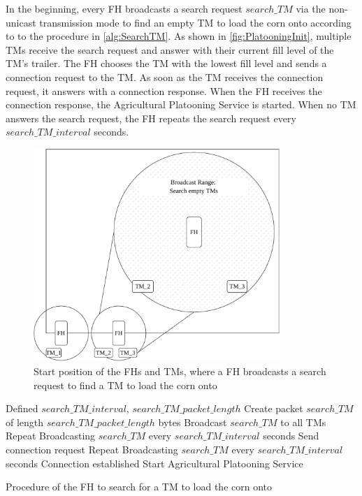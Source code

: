 In the beginning, every \ac{FH} broadcasts a search request $search\_TM$ via the non-unicast transmission mode to find an empty \ac{TM} to load the corn onto according to
to the procedure in \autoref{alg:SearchTM}.
As shown in \autoref{fig:PlatooningInit}, multiple \acp{TM} receive the search request and answer with
their current fill level of the \ac{TM}'s trailer.
The \ac{FH} chooses the \ac{TM} with the lowest fill level and sends a connection request to the \ac{TM}.
As soon as the \ac{TM} receives the connection request, it answers with a connection response.
When the \ac{FH} receives the connection response, the Agricultural Platooning Service is started.
When no \ac{TM} answers the search request, the \ac{FH} repeats the search request every $search\_TM\_interval$ seconds.

\begin{figure}[H]%
   \centering
   \includegraphics[width=0.83\textwidth]{Latex/figures/platoonINIT}
   \caption{Start position of the \acfp{FH} and \acfp{TM}, where a \ac{FH} broadcasts a search request to find
   a \ac{TM} to load the corn onto}
   \label{fig:PlatooningInit}%
\end{figure}

\begin{algorithm}
\begin{algorithmic}[1]
\REQUIRE Defined $search\_TM\_interval$, $search\_TM\_packet\_length$
\STATE Create packet $search\_TM$ of length $search\_TM\_packet\_length$ bytes
\STATE Broadcast $search\_TM$ to all \acp{TM}
    \STATE Repeat Broadcasting $search\_TM$ every $search\_TM\_interval$ seconds
\ELSE
   \STATE Send connection request
      \STATE Repeat Broadcasting $search\_TM$ every $search\_TM\_interval$ seconds
   \ELSE
      \STATE Connection established
      \STATE Start Agricultural Platooning Service
   \ENDIF
\ENDIF
\end{algorithmic}
\caption{Procedure of the \acf{FH} to search for a \acf{TM} to load the corn onto}
\label{alg:SearchTM}
\end{algorithm}

